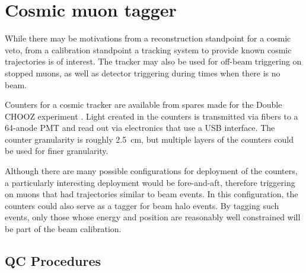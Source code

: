 

\section{Cosmic muon tagger}
\label{muontagger}

        While there may be motivations from a reconstruction standpoint for a
cosmic veto, from a calibration standpoint a tracking system to provide known 
cosmic trajectories is of interest. The tracker may also be used for
off-beam triggering on stopped muons, as well as detector triggering during
times when there is no beam.

        Counters for a cosmic tracker are available from spares made for the
Double CHOOZ experiment \cite{mucounters}. Light created in the
counters is transmitted via fibers to a 64-anode PMT and read out via
electronics that use a USB interface.  The counter granularity is roughly 2.5~cm, but
multiple layers of the counters could be used for finer granularity.


        Although there are many possible configurations for deployment of the
counters, a particularly interesting deployment would be fore-and-aft,
therefore triggering on muons that had trajectories similar to beam events. In
this configuration, the counters could also serve as a tagger for beam halo
events.  By tagging such events, only those whose energy and position are
reasonably well constrained will be part of the beam calibration.





\subsection{QC Procedures}

